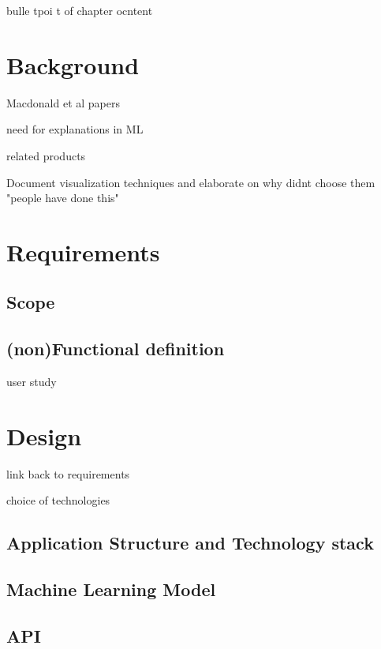 \documentclass{l4proj}
\begin{document}
bulle tpoi t of chapter ocntent


\chapter{Background}

Macdonald et al papers


need for explanations in ML

related products

Document visualization techniques and elaborate on why didnt choose them
"people have done this"

\chapter{Requirements}

\section{Scope}

\section{(non)Functional definition}

user study


\chapter{Design}

link back to requirements

choice of technologies

\section{Application Structure and Technology stack}

\section{Machine Learning Model}

\section{API}
\end{document}
